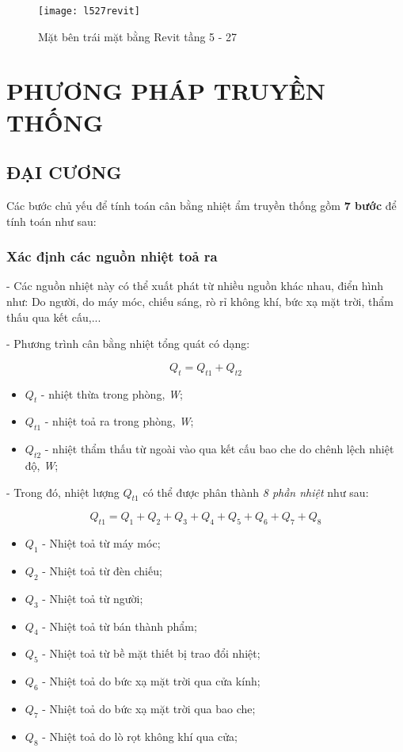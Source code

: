 \begin{figure}[H]
	\centering
	\texttt{[image: l527revit]}
	\caption{Mặt bên trái mặt bằng Revit tầng 5 - 27}
	\label{527revit}
\end{figure} 

\section{PHƯƠNG PHÁP TRUYỀN THỐNG}
\subsection{ĐẠI CƯƠNG}
Các bước chủ yếu để tính toán cân bằng nhiệt ẩm truyền thống gồm \textbf{7 bước} để tính toán như sau:
\subsubsection{Xác định các nguồn nhiệt toả ra}
- Các nguồn nhiệt này có thể xuất phát từ nhiều nguồn khác nhau, điển hình như: Do người, do máy móc, chiếu sáng, rò rỉ không khí, bức xạ mặt trời, thẩm thấu qua kết cấu,...

- Phương trình cân bằng nhiệt tổng quát có dạng:

\begin{equation}
	Q_{t} = Q_{t1} + Q_{t2}
\end{equation}

\begin{itemize}[leftmargin = 3cm, label = $\star$]
	\item $Q_{t}$ - nhiệt thừa trong phòng, \textit{W};
	\item $Q_{t1}$ - nhiệt toả ra trong phòng, \textit{W};
	\item $Q_{t2}$ - nhiệt thẩm thấu từ ngoài vào qua kết cấu bao che do chênh lệch nhiệt độ, \textit{W};
\end{itemize}


- Trong đó, nhiệt lượng $ Q_{t1} $ có thể được phân thành \textit{8 phần nhiệt} như sau:

\begin{equation}
		Q_{t1} = Q_{1} + Q_{2} + Q_{3} + Q_{4} + Q_{5} + Q_{6} + Q_{7} + Q_{8}
\end{equation}

\begin{itemize}[leftmargin = 3cm, label = $\ast$]
	\item $Q_{1}$ - Nhiệt toả từ máy móc;
	\item $Q_{2}$ - Nhiệt toả từ đèn chiếu;
	\item $Q_{3}$ - Nhiệt toả từ người;
	\item $Q_{4}$ - Nhiệt toả từ bán thành phẩm;
	\item $Q_{5}$ - Nhiệt toả từ bề mặt thiết bị trao đổi nhiệt;
	\item $Q_{6}$ - Nhiệt toả do bức xạ mặt trời qua cửa kính;
	\item $Q_{7}$ - Nhiệt toả do bức xạ mặt trời qua bao che;
	\item $Q_{8}$ - Nhiệt toả do lò rọt không khí qua cửa;
\end{itemize}

